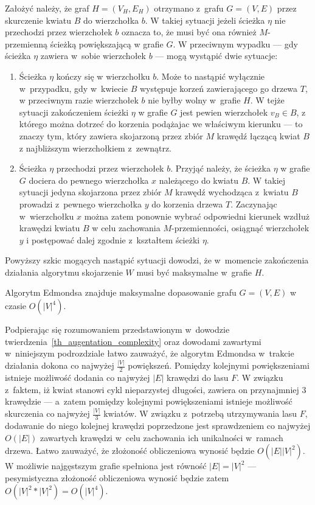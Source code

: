 {\begin{bproof}
    Założyć należy, że graf $H=(V_H, E_H)$ otrzymano z~grafu $G=(V, E)$ przez skurczenie kwiatu $B$ do wierzchołka $b$.
    W takiej sytuacji jeżeli ścieżka $\eta$ nie przechodzi przez wierzchołek $b$ oznacza to, że musi być ona również $M$-przemienną ścieżką powiększającą w grafie $G$. W przeciwnym wypadku --- gdy ścieżka $\eta$ zawiera w~sobie wierzchołek $b$ --- mogą wystąpić dwie sytuacje:
    \begin{enumerate}
      \item Ścieżka $\eta$ kończy się w wierzchołku $b$.
      Może to nastąpić wyłącznie w~przypadku, gdy w~kwiecie $B$ występuje korzeń zawierającego go drzewa $T$, w przeciwnym razie wierzchołek $b$ nie byłby wolny w~grafie $H$.
      W tejże sytuacji zakończeniem ścieżki $\eta$ w grafie $G$ jest pewien wierzchołek $v_B \in B$, z którego można dotrzeć do korzenia podążajac we właściwym kierunku --- to znaczy tym, który zawiera skojarzoną przez zbiór $M$ krawędź łączącą kwiat $B$ z najbliższym wierzchołkiem z~zewnątrz.
      \item Ścieżka $\eta$ przechodzi przez wierzchołek $b$.
      Przyjąć należy, że ścieżka $\eta$ w grafie $G$ dociera do pewnego wierzchołka $x$ należącego do kwiatu $B$.
      W takiej sytuacji jedyna skojarzona przez zbiór $M$ krawędź wychodząca z~kwiatu $B$ prowadzi z~pewnego wierzchołka $y$ do korzenia drzewa $T$.
      Zaczynając w~wierzchołku $x$ można zatem ponownie wybrać odpowiedni kierunek wzdłuż krawędzi kwiatu $B$ w celu zachowania $M$-przemienności, osiągnąć wierzchołek $y$ i postępować dalej zgodnie z~kształtem ścieżki $\eta$.
    \end{enumerate}

    Powyższy szkic mogących nastąpić sytuacji dowodzi, że w~momencie zakończenia działania algorytmu skojarzenie $W$ musi być maksymalne w~grafie $H$.
  \end{bproof}
  \begin{theorem}
    Algorytm Edmondsa znajduje maksymalne dopasowanie grafu $G=(V, E)$ w czasie $O(|V|^4)$.
  \end{theorem}
  \begin{bproof}
    Podpierając się rozumowaniem przedstawionym w~dowodzie twierdzenia~\ref{th_augentation_complexity} oraz dowodami zawartymi w~niniejszym podrozdziale łatwo zauważyć, że algorytm Edmondsa w~trakcie działania dokona co najwyżej $\frac{|V|}{2}$ powiększeń.
    Pomiędzy kolejnymi powiększeniami istnieje możliwość dodania co najwyżej $|E|$ krawędzi do lasu $F$.
    W związku z~faktem, iż kwiat stanowi cykl nieparzystej długości, zawiera on przynajmniej 3 krawędzie --- a~zatem pomiędzy kolejnymi powiększeniami istnieje możliwość skurczenia co najwyżej $\frac{|V|}{3}$ kwiatów.
    W związku z~potrzebą utrzymywania lasu $F$, dodawanie do niego kolejnej krawędzi poprzedzone jest sprawdzeniem co najwyżej $O(|E|)$ zawartych krawędzi w~celu zachowania ich unikalności w~ramach drzewa.
    Łatwo zauważyć, że złożoność obliczeniowa wynosić będzie $O(|E||V|^2)$.
    W możliwie najgęstszym grafie spełniona jest równość $|E|=|V|^2$ --- pesymistyczna złożoność obliczeniowa wynosić będzie zatem $O(|V|^2*|V|^2)=O(|V|^4)$.
  \end{bproof}
}